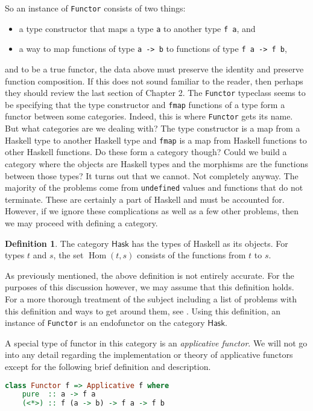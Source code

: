 \documentclass[MS, xcolor=dvipsnames]{wfuthesis}
\def\Hask{\mathsf{Hask}}
\DeclareMathOperator{\Hom}{Hom}
\theoremstyle{definition}
\newtheorem{definition}[theorem]{Definition}
\begin{document}
So an instance of \lstinline{Functor} consists of two things:
\begin{itemize}
  \item a type constructor that maps a type \lstinline{a} to another type \lstinline{f a}, and
  \item a way to map functions of type \lstinline{a -> b} to functions of type \lstinline{f a -> f b},
\end{itemize}
and to be a true functor, the data above must preserve the identity and preserve function composition. If this does not sound familiar to the reader, then perhaps they should review the last section of Chapter 2. The \lstinline{Functor} typeclass seems to be specifying that the type constructor and \lstinline{fmap} functions of a type form a functor between some categories. Indeed, this is where \lstinline{Functor} gets its name. But what categories are we dealing with? The type constructor is a map from a Haskell type to another Haskell type and \lstinline{fmap} is a map from Haskell functions to other Haskell functions. Do these form a category though? Could we build a category where the objects are Haskell types and the morphisms are the functions between those types? It turns out that we cannot. Not completely anyway. The majority of the problems come from \lstinline{undefined} values and functions that do not terminate. These are certainly a part of Haskell and must be accounted for. However, if we ignore these complications as well as a few other problems, then we may proceed with defining a category.
\begin{definition}
  The category $\Hask$ has the types of Haskell as its objects. For types $t$ and $s$, the set $\Hom(t,s)$ consists of the functions from $t$ to $s$.
\end{definition}
As previously mentioned, the above definition is not entirely accurate. For the purposes of this discussion however, we may assume that this definition holds. For a more thorough treatment of the subject including a list of problems with this definition and ways to get around them, see \cite{Milewski2019}. Using this definition, an instance of \lstinline{Functor} is an endofunctor on the category $\Hask$. \par
A special type of functor in this category is an \emph{applicative functor}. We will not go into any detail regarding the implementation or theory of applicative functors except for the following brief definition and description.
\begin{lstlisting}[language=Haskell]
class Functor f => Applicative f where
    pure  :: a -> f a
    (<*>) :: f (a -> b) -> f a -> f b
\end{lstlisting}
\end{document}

